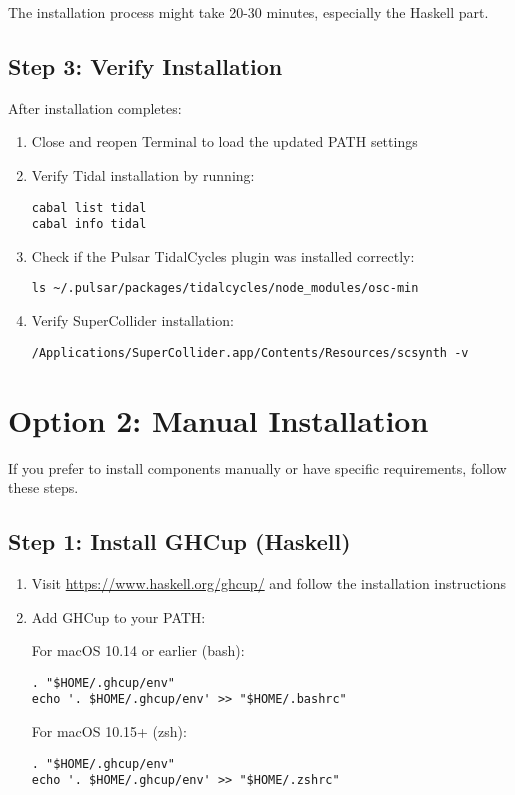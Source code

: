 \documentclass[11pt,a4paper]{article}
\begin{document}
The installation process might take 20-30 minutes, especially the Haskell part.

\subsection{Step 3: Verify Installation}

After installation completes:

\begin{enumerate}
    \item Close and reopen Terminal to load the updated PATH settings
    \item Verify Tidal installation by running:
    \begin{lstlisting}[style=bash]
cabal list tidal
cabal info tidal
    \end{lstlisting}
    \item Check if the Pulsar TidalCycles plugin was installed correctly:
    \begin{lstlisting}[style=bash]
ls ~/.pulsar/packages/tidalcycles/node_modules/osc-min
    \end{lstlisting}
    \item Verify SuperCollider installation:
    \begin{lstlisting}[style=bash]
/Applications/SuperCollider.app/Contents/Resources/scsynth -v
    \end{lstlisting}
\end{enumerate}

\section{Option 2: Manual Installation}

If you prefer to install components manually or have specific requirements, follow these steps.

\subsection{Step 1: Install GHCup (Haskell)}

\begin{enumerate}
    \item Visit \href{https://www.haskell.org/ghcup/}{https://www.haskell.org/ghcup/} and follow the installation instructions
    \item Add GHCup to your PATH:
    
    For macOS 10.14 or earlier (bash):
    \begin{lstlisting}[style=bash]
. "$HOME/.ghcup/env"
echo '. $HOME/.ghcup/env' >> "$HOME/.bashrc"
    \end{lstlisting}
    
    For macOS 10.15+ (zsh):
    \begin{lstlisting}[style=bash]
. "$HOME/.ghcup/env"
echo '. $HOME/.ghcup/env' >> "$HOME/.zshrc"
    \end{lstlisting}
\end{enumerate}
\end{document}
